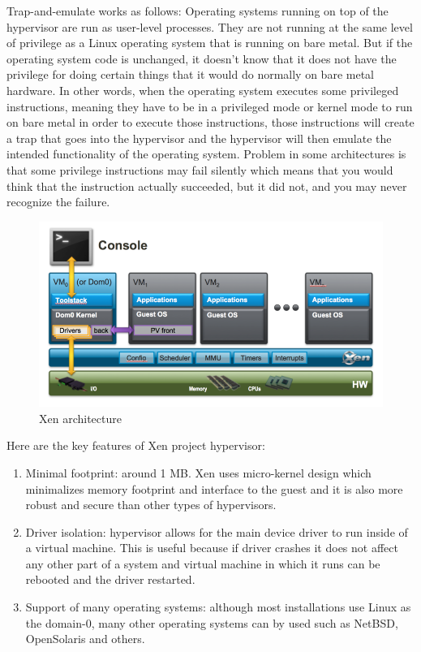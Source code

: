 Trap-and-emulate works as follows: Operating systems running on top of the hypervisor are run as user-level processes. They are not running at the same level of privilege as a Linux operating system that is running on bare metal. But if the operating system code is unchanged, it doesn't know that it does not have the privilege for doing certain things that it would do normally on bare metal hardware. In other words, when the operating system executes some privileged instructions, meaning they have to be in a privileged mode or kernel mode to run on bare metal in order to execute those instructions, those instructions will create a trap that goes into the hypervisor and the hypervisor will then emulate the intended functionality of the operating system. Problem in some architectures is that some privilege instructions may fail silently which means that you would think that the instruction actually succeeded, but it did not, and you may never recognize the failure.

\begin{figure}[H]
\centering
\includegraphics[scale=1]{xen-diagram.png}
\caption{Xen architecture \cite{xen_project}}
\end{figure}

Here are the key features of Xen project hypervisor:
\begin{enumerate}
\item Minimal footprint: around 1 MB. Xen uses micro-kernel design which minimalizes memory footprint and interface to the guest and it is also more robust and secure than other types of hypervisors.
\item Driver isolation: hypervisor allows for the main device driver to run inside of a virtual machine. This is useful because if driver crashes it does not affect any other part of a system and virtual machine in which it runs can be rebooted and the driver restarted.
\item Support of many operating systems: although most installations use Linux as the domain-0, many other operating systems can by used such as NetBSD, OpenSolaris and others.
\end{enumerate}


